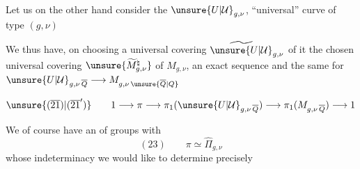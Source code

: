 Let us on the other hand consider the  $\unsure{U|\mathcal{U}}_{g,\nu}$, ``universal'' curve of type $(g,\nu)$

We thus have, on choosing a universal covering $\widetilde{\unsure{U|\mathcal{U}}}_{g,\nu}$ of it \uline{} the chosen universal covering $\unsure{\widetilde{M}_{g,\nu}^{\natural}}$ of $M_{g,\nu}$, an exact sequence
and the same for $\unsure{U|\mathcal{U}}_{g,\nu\,\overline{Q}}\longrightarrow M_{g,\nu\,\unsure{\overline{Q}|Q}}$



\[
\unsure{(\overline{21})|(\overline{21}')}\qquad
1\longrightarrow\pi\longrightarrow\pi_1(\unsure{U|\mathcal{U}}_{g,\nu\,\overline{Q}})
\longrightarrow\pi_1(M_{g,\nu\,\overline{Q}})\longrightarrow1
\]

We of course have an  of groups with 
\[
(23)\qquad \pi\simeq\widehat{\Pi}_{g,\nu}
\]
whose indeterminacy we would like to determine precisely

